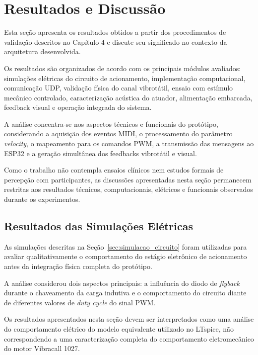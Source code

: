 \chapter{Resultados e Discussão}

Esta seção apresenta os resultados obtidos a partir dos procedimentos de validação descritos no Capítulo 4 e discute seu significado no contexto da arquitetura desenvolvida.

Os resultados são organizados de acordo com os principais módulos avaliados: simulações elétricas do circuito de acionamento, implementação computacional, comunicação UDP, validação física do canal vibrotátil, ensaio com estímulo mecânico controlado, caracterização acústica do atuador, alimentação embarcada, feedback visual e operação integrada do sistema.

A análise concentra-se nos aspectos técnicos e funcionais do protótipo, considerando a aquisição dos eventos MIDI, o processamento do parâmetro \textit{velocity}, o mapeamento para os comandos PWM, a transmissão das mensagens ao ESP32 e a geração simultânea dos feedbacks vibrotátil e visual.

Como o trabalho não contempla ensaios clínicos nem estudos formais de percepção com participantes, as discussões apresentadas nesta seção permanecem restritas aos resultados técnicos, computacionais, elétricos e funcionais observados durante os experimentos.


\section{Resultados das Simulações Elétricas}
\label{sec:resultados_simulacoes_eletricas}

As simulações descritas na Seção~\ref{sec:simulacao_circuito} foram utilizadas para avaliar qualitativamente o comportamento do estágio eletrônico de acionamento antes da integração física completa do protótipo.

A análise considerou dois aspectos principais: a influência do diodo de \textit{flyback} durante o chaveamento da carga indutiva e o comportamento do circuito diante de diferentes valores de \textit{duty cycle} do sinal PWM.

Os resultados apresentados nesta seção devem ser interpretados como uma análise do comportamento elétrico do modelo equivalente utilizado no LTspice, não correspondendo a uma caracterização completa do comportamento eletromecânico do motor Vibracall 1027.


